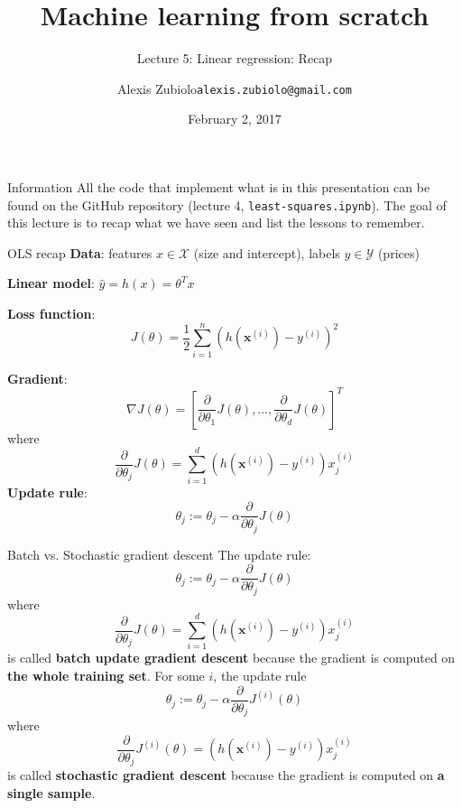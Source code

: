 \documentclass{beamer}
\title[Course presentation]{Machine learning from scratch}
\subtitle{Lecture 5: Linear regression: Recap}
\author{Alexis Zubiolo\newline\texttt{alexis.zubiolo@gmail.com}}
\institute{Data Science Team Lead @ Adcash}
\date{February 2, 2017}
\newcommand{\X}{\mathcal{X}}
\newcommand{\Y}{\mathcal{Y}}
\newcommand{\bxi}{\bm{x}^{(i)}}
\newcommand{\yi}{y^{(i)}}
\newcommand{\1}[1]{\mathbbm{1}\left[#1\right]}
\begin{document}
\begin{frame}
  \titlepage
\end{frame}

\begin{frame}{Information}
All the code that implement what is in this presentation can be found on the GitHub repository (lecture 4, \texttt{least-squares.ipynb}).
\pause
\vfill
The goal of this lecture is to recap what we have seen and list the lessons to remember.
\end{frame}

\begin{frame}{OLS recap}
\textbf{Data}: features $x \in \X$ (size and intercept), labels $y \in \Y$ (prices)

\textbf{Linear model}: $\hat{y} = h(x) = \theta^T x$

\textbf{Loss function}:
\begin{equation*}
J(\theta) = \dfrac{1}{2} \sum_{i = 1}^{n} \left( h\left(\bxi\right) - \yi \right)^2
\end{equation*}

\textbf{Gradient}: 
\begin{equation*}
\nabla J(\theta) = \left[ \dfrac{\partial}{\partial \theta_1} J(\theta), \dots, \dfrac{\partial}{\partial \theta_d} J(\theta) \right]^T
\end{equation*}
where
\begin{equation*}
\dfrac{\partial}{\partial \theta_j} J(\theta) = \sum_{i = 1}^{d}\left( h\left(\bxi\right) - \yi \right) x^{(i)}_j
\end{equation*}
\textbf{Update rule}:
\begin{equation*}
\theta_j := \theta_j - \alpha \dfrac{\partial}{\partial \theta_j} J(\theta)
\end{equation*}
\end{frame}

\begin{frame}{Batch vs. Stochastic gradient descent}
The update rule:
\begin{equation*}
\theta_j := \theta_j - \alpha \dfrac{\partial}{\partial \theta_j} J(\theta)
\end{equation*}
where
\begin{equation*}
\dfrac{\partial}{\partial \theta_j} J(\theta) = \sum_{i = 1}^{d}\left( h\left(\bxi\right) - \yi \right) x^{(i)}_j
\end{equation*}
is called \textbf{batch update gradient descent} because the gradient is computed on \textbf{the whole training set}. \pause For some $i$, the update rule 
\begin{equation*}
\theta_j := \theta_j - \alpha \dfrac{\partial}{\partial \theta_j} J^{(i)}(\theta)
\end{equation*}
where
\begin{equation*}
\dfrac{\partial}{\partial \theta_j} J^{(i)}(\theta) = \left( h\left(\bxi\right) - \yi \right) x^{(i)}_j
\end{equation*}
is called \textbf{stochastic gradient descent} because the gradient is computed on \textbf{a single sample}.
\end{frame}
\end{document}
